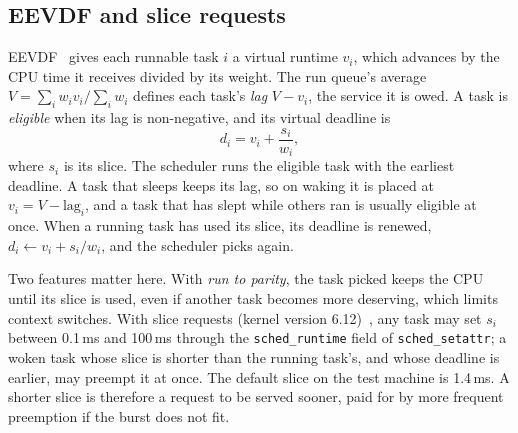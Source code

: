 \documentclass[conference,onecolumn,11pt]{IEEEtran}
\begin{document}
\subsection{EEVDF and slice requests}
EEVDF~\cite{stoica1995} gives each runnable task $i$ a virtual runtime $v_i$, which advances by the CPU time it receives divided by its weight. The run queue's average $V=\sum_i w_iv_i/\sum_i w_i$ defines each task's \emph{lag} $V-v_i$, the service it is owed. A task is \emph{eligible} when its lag is non-negative, and its virtual deadline is
\begin{equation}
d_i = v_i + \frac{s_i}{w_i},
\end{equation}
where $s_i$ is its slice. The scheduler runs the eligible task with the earliest deadline. A task that sleeps keeps its lag, so on waking it is placed at $v_i=V-\text{lag}_i$, and a task that has slept while others ran is usually eligible at once. When a running task has used its slice, its deadline is renewed, $d_i\leftarrow v_i+s_i/w_i$, and the scheduler picks again.

Two features matter here. With \emph{run to parity}, the task picked keeps the CPU until its slice is used, even if another task becomes more deserving, which limits context switches. With slice requests (kernel version 6.12)~\cite{corbet2024,eevdfdoc}, any task may set $s_i$ between 0.1\,ms and 100\,ms through the \texttt{sched\_runtime} field of \texttt{sched\_setattr}; a woken task whose slice is shorter than the running task's, and whose deadline is earlier, may preempt it at once. The default slice on the test machine is 1.4\,ms. A shorter slice is therefore a request to be served sooner, paid for by more frequent preemption if the burst does not fit.
\end{document}
